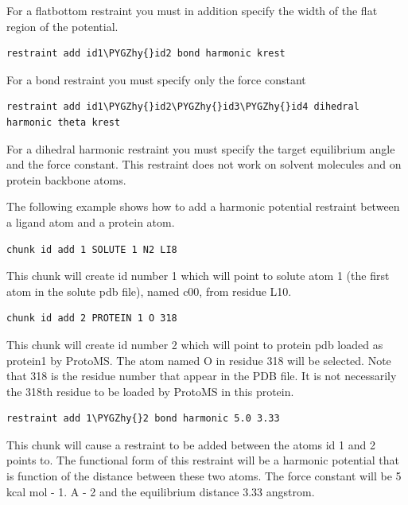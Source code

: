 \documentclass[letterpaper,10pt,english]{sphinxmanual}
\def\PYGZhy{\char`\-}
\begin{document}
For a flatbottom restraint you must in addition specify the width of the flat region of the potential.

\begin{Verbatim}[commandchars=\\\{\}]
restraint add id1\PYGZhy{}id2 bond harmonic krest
\end{Verbatim}

For a bond restraint you must specify only the force constant

\begin{Verbatim}[commandchars=\\\{\}]
restraint add id1\PYGZhy{}id2\PYGZhy{}id3\PYGZhy{}id4 dihedral harmonic theta krest
\end{Verbatim}

For a dihedral harmonic restraint you must specify the target equilibrium angle and the force constant. This restraint does not work on solvent molecules and on protein backbone atoms.

The following example shows how to add a harmonic potential restraint between a ligand atom and a protein atom.

\begin{Verbatim}[commandchars=\\\{\}]
chunk id add 1 SOLUTE 1 N2 LI8
\end{Verbatim}

This chunk will create id number 1 which will point to solute atom 1 (the first atom in the solute pdb file), named c00, from residue L10.

\begin{Verbatim}[commandchars=\\\{\}]
chunk id add 2 PROTEIN 1 O 318
\end{Verbatim}

This chunk will create id number 2 which will point to protein pdb loaded as protein1 by ProtoMS. The atom named O in residue 318 will be selected. Note that 318 is the residue number that appear in the PDB file. It is not necessarily the 318th residue to be loaded by ProtoMS in this protein.

\begin{Verbatim}[commandchars=\\\{\}]
restraint add 1\PYGZhy{}2 bond harmonic 5.0 3.33
\end{Verbatim}

This chunk will cause a restraint to be added between the atoms id 1 and 2 points to. The functional form of this restraint will be a harmonic potential that is function of the distance between these two atoms. The force constant will be 5 kcal mol - 1. A - 2 and the equilibrium distance 3.33 angstrom.
\end{document}
